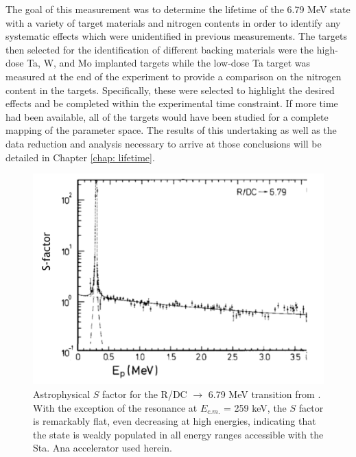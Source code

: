 The goal of this measurement was to determine the lifetime of the 6.79 MeV state with a variety of target materials and nitrogen contents in order to identify any systematic effects which were unidentified in previous measurements. The targets then selected for the identification of different backing materials were the high-dose Ta, W, and Mo implanted targets while the low-dose Ta target was measured at the end of the experiment to provide a comparison on the nitrogen content in the targets. Specifically, these were selected to highlight the desired effects and be completed within the experimental time constraint. If more time had been available, all of the targets would have been studied for a complete mapping of the parameter space. The results of this undertaking as well as the data reduction and analysis necessary to arrive at those conclusions will be detailed in Chapter \ref{chap: lifetime}.


\begin{figure}
\centering
\includegraphics[width=0.7\linewidth]{figures/schroderSfac.png}
\caption{Astrophysical $S$ factor for the R/DC $\rightarrow$ 6.79 MeV transition from \cite{Schroder1987}. With the exception of the resonance at $E_{c.m.}$ = 259 keV, the $S$ factor is remarkably flat, even decreasing at high energies, indicating that the state is weakly populated in all energy ranges accessible with the Sta. Ana accelerator used herein. }
\label{fig: schroderSfac}
\end{figure}


